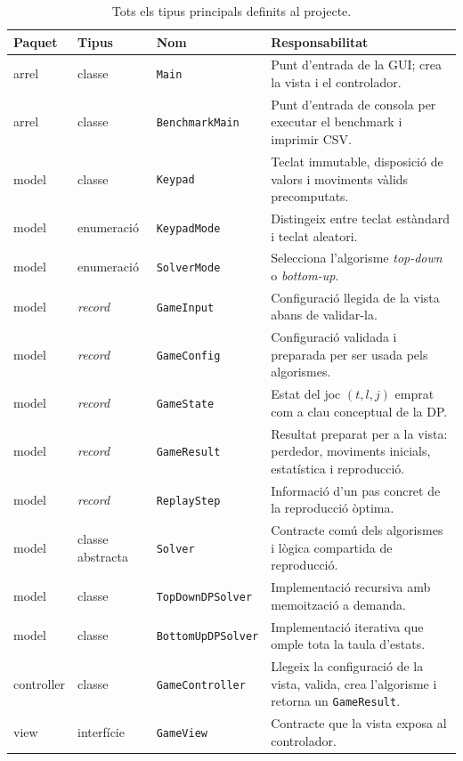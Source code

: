 \documentclass[conference,compsoc]{IEEEtran}
\begin{document}
\begin{table}[t]
\centering
\caption{Tots els tipus principals definits al projecte.}
\label{tab:classes}
\scriptsize
\begin{tabular}{@{}lll p{}@{}}
\toprule
\textbf{Paquet} & \textbf{Tipus} & \textbf{Nom} & \textbf{Responsabilitat} \\
\midrule
arrel & classe & \texttt{Main} & Punt d'entrada de la GUI; crea la vista i el controlador. \\
arrel & classe & \texttt{BenchmarkMain} & Punt d'entrada de consola per executar el benchmark i imprimir CSV. \\
model & classe & \texttt{Keypad} & Teclat immutable, disposició de valors i moviments vàlids precomputats. \\
model & enumeració & \texttt{KeypadMode} & Distingeix entre teclat estàndard i teclat aleatori. \\
model & enumeració & \texttt{SolverMode} & Selecciona l'algorisme \textit{top-down} o \textit{bottom-up}. \\
model & \textit{record} & \texttt{GameInput} & Configuració llegida de la vista abans de validar-la. \\
model & \textit{record} & \texttt{GameConfig} & Configuració validada i preparada per ser usada pels algorismes. \\
model & \textit{record} & \texttt{GameState} & Estat del joc $(t,l,j)$ emprat com a clau conceptual de la DP. \\
model & \textit{record} & \texttt{GameResult} & Resultat preparat per a la vista: perdedor, moviments inicials, estatística i reproducció. \\
model & \textit{record} & \texttt{ReplayStep} & Informació d'un pas concret de la reproducció òptima. \\
model & classe abstracta & \texttt{Solver} & Contracte comú dels algorismes i lògica compartida de reproducció. \\
model & classe & \texttt{TopDownDPSolver} & Implementació recursiva amb memoització a demanda. \\
model & classe & \texttt{BottomUpDPSolver} & Implementació iterativa que omple tota la taula d'estats. \\
controller & classe & \texttt{GameController} & Llegeix la configuració de la vista, valida, crea l'algorisme i retorna un \texttt{GameResult}. \\
view & interfície & \texttt{GameView} & Contracte que la vista exposa al controlador. \\

\end{tabular}
\end{table}
\end{document}
